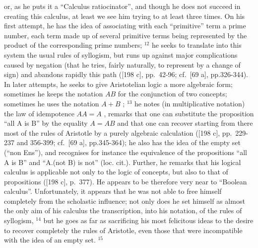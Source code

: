 or, as he puts it a ``Calculus ratiocinator'', and though he does not succeed in creating this calculus, at least we see him trying to at least three times. On his first attempt, he has the idea of associating with each ``primitive'' term a prime number, each term made up of several primitive terms being represented by the product of the corresponding prime numbers; \(^{12}\) he seeks to translate into this system the usual rules of syllogism, but runs up against major complications caused by negation (that he tries, fairly naturally, to represent by a change of sign) and abandons rapidly this path ({[}198 c{]}, pp.~42-96; cf.~{[}69 a{]}, pp.326-344). In later attempts, he seeks to give Aristotelian logic a more algebraic form; sometimes he keeps the notation \(AB\) for the conjunction of two concepts; sometimes he uses the notation \(A + B\) ; \(^{13}\) he notes (in multiplicative notation) the law of idempotence \(AA = A\) , remarks that one can substitute the proposition ``all A is B'' by the equality \(A = AB\) and that one can recover starting from there most of the rules of Aristotle by a purely algebraic calculation ({[}198 c{]}, pp.~229-237 and 356-399; cf.~{[}69 a{]}, pp.345-364); he also has the idea of the empty set (``non Ens''), and recognises for instance the equivalence of the propositions ``all A is B'' and ``A.(not B) is not'' (loc. cit.). Further, he remarks that his logical calculus is applicable not only to the logic of concepts, but also to that of propositions ({[}198 c{]}, p.~377). He appears to be therefore very near to ``Boolean calculus''. Unfortunately, it appears that he was not able to free himself completely from the scholastic influence; not only does he set himself as almost the only aim of his calculus the transcription, into his notation, of the rules of syllogism, \(^{14}\) but he goes as far as sacrificing his most felicitous ideas to the desire to recover completely the rules of Aristotle, even those that were incompatible with the idea of an empty set. \(^{15}\)


